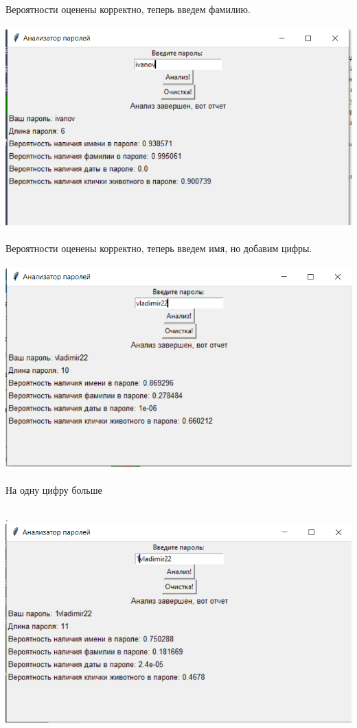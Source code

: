 \documentclass[a4paper,12pt]{article}
\begin{document}
Вероятности оценены корректно, теперь введем фамилию.\\\\
\includegraphics[width=\linewidth]{image4.png}\\\\
Вероятности оценены корректно, теперь введем имя, но добавим цифры.\\\\
\includegraphics[width=\linewidth]{image5.png}\\\\
На одну цифру больше\\\\.
\includegraphics[width=\linewidth]{image6.png}\\\\
\end{document}
